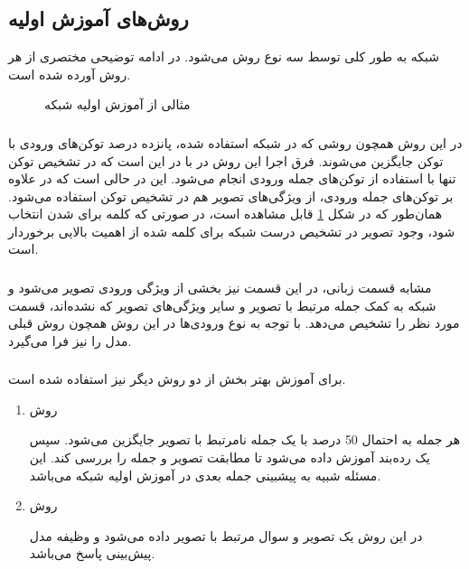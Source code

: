 \subsection{ روش‌های آموزش اولیه}

شبکه 
به طور کلی توسط سه نوع روش
می‌شود. در ادامه توضیحی مختصری از هر روش آورده شده است.
\begin{figure}[H]
	\caption{مثالی از آموزش اولیه
	شبکه
	  \cite{tan2019lxmert}}
	\label{lxmert-pretrain}
\end{figure}
\subsubsection{}
در این روش همچون روشی که در شبکه
استفاده شده، پانزده درصد توکن‌های ورودی با توکن
جایگزین می‌شوند. فرق اجرا این روش در 
با 
در این است که در 
تشخیص توکن
تنها با استفاده از توکن‌های جمله ورودی انجام می‌شود. این در حالی است که در 
علاوه بر توکن‌های جمله ورودی، از ویژگی‌های تصویر هم در تشخیص توکن
استفاده می‌شود. همان‌طور که در شکل 
\ref{lxmert-pretrain}
قابل مشاهده است، در صورتی که کلمه
برای 
شدن انتخاب شود،
وجود تصویر در تشخیص درست شبکه برای کلمه 
شده از اهمیت بالایی برخوردار است.
\subsubsection{}
مشابه قسمت زبانی، در این قسمت نیز بخشی از ویژگی ورودی تصویر
می‌شود و شبکه به کمک جمله مرتبط با تصویر و سایر ویژگی‌های تصویر که
نشده‌اند، قسمت مورد نظر را تشخیص می‌دهد. با توجه به نوع ورودی‌ها در این روش همچون روش قبلی مدل
را نیز فرا می‌گیرد. 

\subsubsection{}
برای آموزش بهتر بخش 
از دو روش دیگر نیز استفاده شده است.
\begin{enumerate}
	\item روش 
	
هر جمله به احتمال 50 درصد با یک جمله نامرتبط با تصویر جایگزین می‌شود. سپس یک رده‌بند
آموزش داده می‌شود تا مطابقت تصویر و جمله را بررسی کند. این مسئله شبیه به پیشبینی جمله بعدی 
در آموزش اولیه شبکه 
می‌باشد.

	\item روش 
	
در این روش یک تصویر و سوال مرتبط با تصویر داده می‌شود و وظیفه مدل پیش‌بینی پاسخ می‌باشد.
\end{enumerate}


